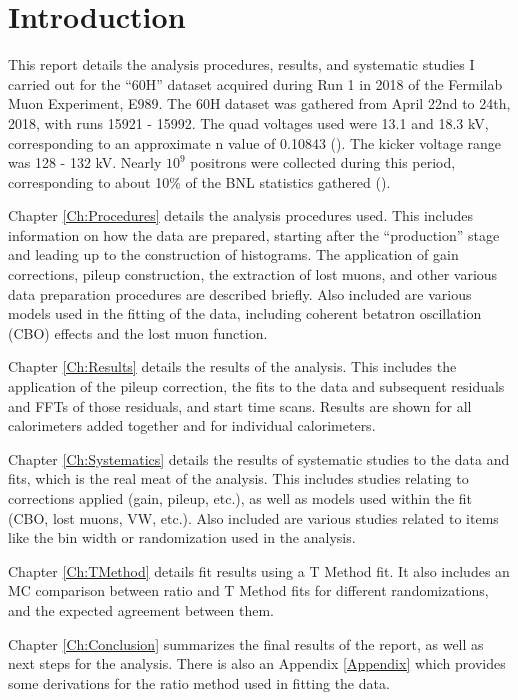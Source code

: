 \chapter{Introduction}
\label{Ch:Introduction}

This report details the analysis procedures, results, and systematic studies I carried out for the ``60H'' dataset acquired during Run 1 in 2018 of the Fermilab Muon \gmtwo Experiment, E989. The 60H dataset was gathered from April 22nd to 24th, 2018, with runs 15921 - 15992. The quad voltages used were 13.1 and 18.3 kV, corresponding to an approximate n value of 0.10843 (). The kicker voltage range was 128 - 132 kV. Nearly $10^{9}$ positrons were collected during this period, corresponding to about 10\% of the BNL statistics gathered ().

Chapter \ref{Ch:Procedures} details the analysis procedures used. This includes information on how the data are prepared, starting after the ``production'' stage and leading up to the construction of histograms. The application of gain corrections, pileup construction, the extraction of lost muons, and other various data preparation procedures are described briefly. Also included are various models used in the fitting of the data, including coherent betatron oscillation (CBO) effects and the lost muon function.

Chapter \ref{Ch:Results} details the results of the analysis. This includes the application of the pileup correction, the fits to the data and subsequent residuals and FFTs of those residuals, and start time scans. Results are shown for all calorimeters added together and for individual calorimeters.

Chapter \ref{Ch:Systematics} details the results of systematic studies to the data and fits, which is the real meat of the analysis. This includes studies relating to corrections applied (gain, pileup, etc.), as well as models used within the fit (CBO, lost muons, VW, etc.). Also included are various studies related to items like the bin width or randomization used in the analysis.

Chapter \ref{Ch:TMethod} details fit results using a T Method fit. It also includes an MC comparison between ratio and T Method fits for different randomizations, and the expected agreement between them.

Chapter \ref{Ch:Conclusion} summarizes the final results of the report, as well as next steps for the analysis. There is also an Appendix \ref{Appendix} which provides some derivations for the ratio method used in fitting the data.
